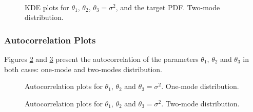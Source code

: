 \begin{figure}[hptb]
\centering
{}
\\
\vspace{-10pt}
\caption{KDE plots for $\theta_1$, $\theta_2$, $\theta_3=\sigma^2$, and the target PDF. Two-mode distribution.}
\label{fig:modal_kde_2modes}
\end{figure}


\subsubsection{Autocorrelation Plots}

Figures \ref{fig:modal_autocorr_1mode} and \ref{fig:modal_autocorr_2modes} present the autocorrelation of the parameters $\theta_1$, $\theta_2$ and $\theta_3$ in both cases: one-mode and two-modes distribution.

\begin{figure}[htpb]
\centering
{}
\vspace{-10pt}
\caption{Autocorrelation plots for $\theta_1$, $\theta_2$ and $\theta_3=\sigma^2$. One-mode distribution.}
\label{fig:modal_autocorr_1mode}
\end{figure}

\begin{figure}[htpb]
\centering
{}
\vspace{-10pt}
\caption{Autocorrelation plots for $\theta_1$, $\theta_2$ and $\theta_3=\sigma^2$. Two-mode distribution.}
\label{fig:modal_autocorr_2modes}
\end{figure}
